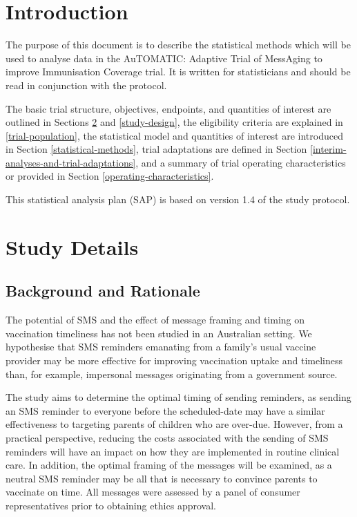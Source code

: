 \documentclass[
  bibliography=totoc]{scrreprt}
\begin{document}
\hypertarget{introduction}{%
\chapter{Introduction}\label{introduction}}

The purpose of this document is to describe the statistical methods which will be used to analyse data in the AuTOMATIC: Adaptive Trial of MessAging to improve Immunisation Coverage trial.
It is written for statisticians and should be read in conjunction with the protocol.

The basic trial structure, objectives, endpoints, and quantities of interest are outlined in Sections \ref{study-details} and \ref{study-design}, the eligibility criteria are explained in \ref{trial-population}, the statistical model and quantities of interest are introduced in Section \ref{statistical-methods}, trial adaptations are defined in Section \ref{interim-analyses-and-trial-adaptations}, and a summary of trial operating characteristics or provided in Section \ref{operating-characteristics}.

This statistical analysis plan (SAP) is based on version 1.4 of the study protocol.

\hypertarget{study-details}{%
\chapter{Study Details}\label{study-details}}

\hypertarget{background-and-rationale}{%
\section{Background and Rationale}\label{background-and-rationale}}

The potential of SMS and the effect of message framing and timing on vaccination timeliness has not been studied in an Australian setting.
We hypothesise that SMS reminders emanating from a family's usual vaccine provider may be more effective for improving vaccination uptake and timeliness than, for example, impersonal messages originating from a government source.

The study aims to determine the optimal timing of sending reminders, as sending an SMS reminder to everyone before the scheduled-date may have a similar effectiveness to targeting parents of children who are over-due.
However, from a practical perspective, reducing the costs associated with the sending of SMS reminders will have an impact on how they are implemented in routine clinical care.
In addition, the optimal framing of the messages will be examined, as a neutral SMS reminder may be all that is necessary to convince parents to vaccinate on time.
All messages were assessed by a panel of consumer representatives prior to obtaining ethics approval.
\end{document}
